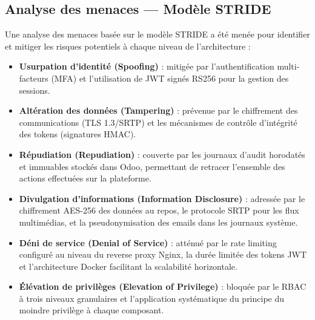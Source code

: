 \subsection{Analyse des menaces — Modèle STRIDE}
Une analyse des menaces basée sur le modèle STRIDE \cite{stride} a été menée pour identifier et mitiger les risques potentiels à chaque niveau de l'architecture :
\begin{itemize}
    \item \textbf{Usurpation d'identité (Spoofing)} : mitigée par l'authentification multi-facteurs (MFA) et l'utilisation de JWT signés RS256 pour la gestion des sessions.
    \item \textbf{Altération des données (Tampering)} : prévenue par le chiffrement des communications (TLS 1.3/SRTP) et les mécanismes de contrôle d'intégrité des tokens (signatures HMAC).
    \item \textbf{Répudiation (Repudiation)} : couverte par les journaux d'audit horodatés et immuables stockés dans Odoo, permettant de retracer l'ensemble des actions effectuées sur la plateforme.
    \item \textbf{Divulgation d'informations (Information Disclosure)} : adressée par le chiffrement AES-256 des données au repos, le protocole SRTP pour les flux multimédias, et la pseudonymisation des emails dans les journaux système.
    \item \textbf{Déni de service (Denial of Service)} : atténué par le rate limiting configuré au niveau du reverse proxy Nginx, la durée limitée des tokens JWT et l'architecture Docker facilitant la scalabilité horizontale.
    \item \textbf{Élévation de privilèges (Elevation of Privilege)} : bloquée par le RBAC à trois niveaux granulaires et l'application systématique du principe du moindre privilège à chaque composant.
\end{itemize}

